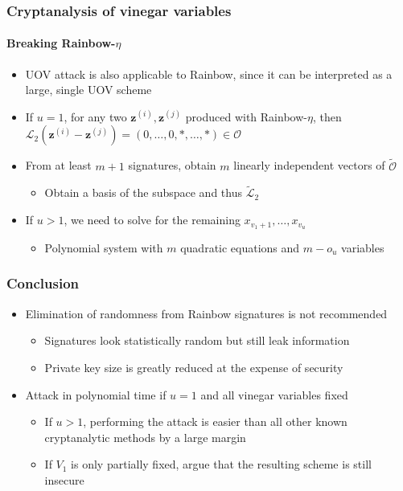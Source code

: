 \documentclass[12pt]{beamer}
\begin{document}
\begin{frame}
  \frametitle{Cryptanalysis of vinegar variables}
  \framesubtitle{Breaking Rainbow-$\eta$}
  \begin{itemize}
    \item UOV attack is also applicable to Rainbow, since it can be interpreted
        as a large, single UOV scheme
    \item If $u = 1$, for any two $\textbf{z}^{(i)}, \textbf{z}^{(j)}$ produced
        with Rainbow-$\eta$, then
          $\mathcal{L}_{2}(\textbf{z}^{(i)} - \textbf{z}^{(j)})
             = (0, \dots, 0, \ast, \dots, \ast) \in \mathcal{O}$
    \item From at least $m + 1$ signatures, obtain $m$ linearly independent
        vectors of $\widetilde{\mathcal{O}}$
    \begin{itemize}
      \item Obtain a basis of the subspace and thus
          $\widetilde{\mathcal{L}}_{2}$
    \end{itemize}
    \item If $u > 1$, we need to solve for the remaining
        $x_{v_{1} + 1}, \dots, x_{v_{u}}$
    \begin{itemize}
      \item Polynomial system with $m$ quadratic equations and $m - o_{u}$
          variables
    \end{itemize}
  \end{itemize}
\end{frame}

\begin{frame}
  \frametitle{Conclusion}
  \begin{itemize}
    \item Elimination of randomness from Rainbow signatures is not recommended
    \begin{itemize}[itemsep=1pt]
      \item Signatures look statistically random but still leak information
      \item Private key size is greatly reduced at the expense of security
    \end{itemize}
    \item Attack in polynomial time if $u = 1$ and all vinegar variables fixed
    \begin{itemize}[itemsep=1pt]
      \item If $u > 1$, performing the attack is easier than all other known
          cryptanalytic methods by a large margin
      \item If $V_{1}$ is only partially fixed, \cite{Shim:202002} argue that
          the resulting scheme is still insecure
    \end{itemize}
  \end{itemize}
\end{frame}
\end{document}
